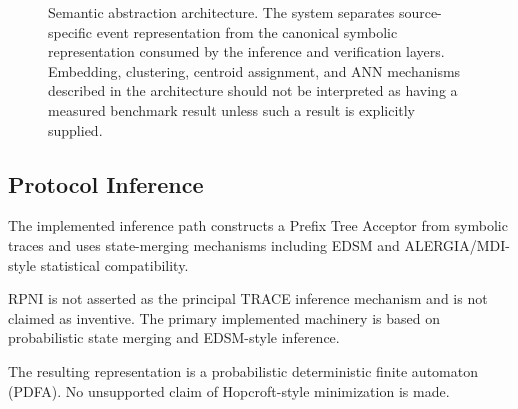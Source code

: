 \documentclass[11pt,a4paper]{article}
\begin{document}
\begin{figure}[!htbp]
\begin{tikzpicture}
\end{tikzpicture}

\caption{Semantic abstraction architecture. The system separates source-specific event
representation from the canonical symbolic representation consumed by the inference
and verification layers. Embedding, clustering, centroid assignment, and ANN mechanisms
described in the architecture should not be interpreted as having a measured benchmark
result unless such a result is explicitly supplied.}
\label{fig:semantic}

\end{figure}

\subsection{Protocol Inference}

The implemented inference path constructs a Prefix Tree Acceptor from symbolic traces and
uses state-merging mechanisms including EDSM and ALERGIA/MDI-style statistical
compatibility.

RPNI is not asserted as the principal TRACE inference mechanism and is not claimed as
inventive. The primary implemented machinery is based on probabilistic state merging and
EDSM-style inference.

The resulting representation is a probabilistic deterministic finite automaton (PDFA).
No unsupported claim of Hopcroft-style minimization is made.
\end{document}
